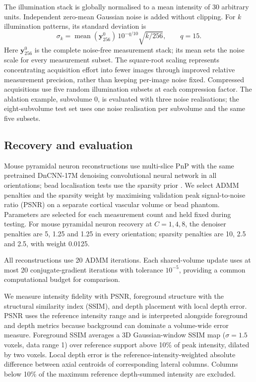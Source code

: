 The illumination stack is globally normalised to a mean intensity of 30 arbitrary units. Independent zero-mean Gaussian noise is added without clipping. For \(k\) illumination patterns, its standard deviation is
\[
\sigma_k=\operatorname{mean}(\mathbf y_{256}^0)
\,10^{-q/10}\sqrt{k/256},\qquad q=15.
\tag{8}
\]
Here \(\mathbf y_{256}^0\) is the complete noise-free measurement stack; its mean sets the noise scale for every measurement subset. The square-root scaling represents concentrating acquisition effort into fewer images through improved relative measurement precision, rather than keeping per-image noise fixed. Compressed acquisitions use five random illumination subsets at each compression factor. The ablation example, subvolume 0, is evaluated with three noise realisations; the eight-subvolume test set uses one noise realisation per subvolume and the same five subsets.

\subsection{Recovery and evaluation}

Mouse pyramidal neuron reconstructions use multi-slice PnP with the same pretrained DnCNN-17M denoising convolutional neural network in all orientations; bead localisation tests use the sparsity prior \cite{zhang2017}. We select ADMM penalties and the sparsity weight by maximising validation peak signal-to-noise ratio (PSNR) on a separate cortical vascular volume or bead phantom. Parameters are selected for each measurement count and held fixed during testing. For mouse pyramidal neuron recovery at \(C=1,4,8\), the denoiser penalties are 5, 1.25 and 1.25 in every orientation; sparsity penalties are 10, 2.5 and 2.5, with weight 0.0125.

All reconstructions use 20 ADMM iterations. Each shared-volume update uses at most 20 conjugate-gradient iterations with tolerance \(10^{-5}\), providing a common computational budget for comparison.

We measure intensity fidelity with PSNR, foreground structure with the structural similarity index (SSIM), and depth placement with local depth error. PSNR uses the reference intensity range and is interpreted alongside foreground and depth metrics because background can dominate a volume-wide error measure. Foreground SSIM averages a 3D Gaussian-window SSIM map (\(\sigma=1.5\) voxels, data range 1) over reference support above 10\% of peak intensity, dilated by two voxels. Local depth error is the reference-intensity-weighted absolute difference between axial centroids of corresponding lateral columns. Columns below 10\% of the maximum reference depth-summed intensity are excluded.

